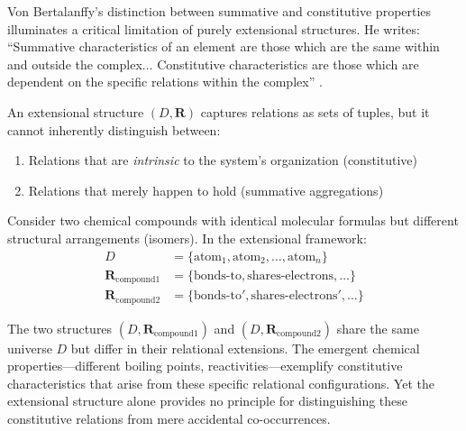 Von Bertalanffy's distinction between summative and constitutive properties illuminates a critical limitation of purely extensional structures. He writes: ``Summative characteristics of an element are those which are the same within and outside the complex... Constitutive characteristics are those which are dependent on the specific relations within the complex'' \cite{Bertalanffy1968}.

An extensional structure $(D, \mathbf{R})$ captures relations as sets of tuples, but it cannot inherently distinguish between:
\begin{enumerate}
	\item Relations that are \emph{intrinsic} to the system's organization (constitutive)
	\item Relations that merely happen to hold (summative aggregations)
\end{enumerate}

\begin{example}
	Consider two chemical compounds with identical molecular formulas but different structural arrangements (isomers). In the extensional framework:
	\begin{align*}
		D &= \{\text{atom}_1, \text{atom}_2, \ldots, \text{atom}_n\} \\
		\mathbf{R}_{\text{compound1}} &= \{\text{bonds-to}, \text{shares-electrons}, \ldots\} \\
		\mathbf{R}_{\text{compound2}} &= \{\text{bonds-to}', \text{shares-electrons}', \ldots\}
	\end{align*}
	
	The two structures $(D, \mathbf{R}_{\text{compound1}})$ and $(D, \mathbf{R}_{\text{compound2}})$ share the same universe $D$ but differ in their relational extensions. The emergent chemical properties—different boiling points, reactivities—exemplify constitutive characteristics that arise from these specific relational configurations. Yet the extensional structure alone provides no principle for distinguishing these constitutive relations from mere accidental co-occurrences.
\end{example}